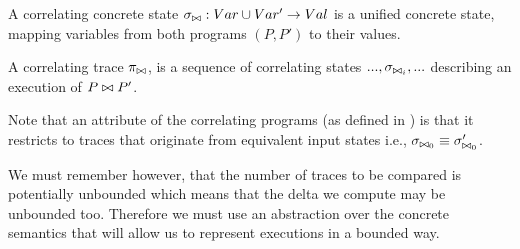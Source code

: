 \begin{definition}
A correlating concrete state $\sigma_{\bowtie} : Var \cup Var' \rightarrow Val$ is a unified concrete state, mapping variables from both programs $(P,P')$ to their values.
\end{definition}

\begin{definition}
A correlating trace $\pi_{\bowtie}$, is a sequence of correlating states $..., \sigma_{\bowtie_{i}}, ...$ describing an execution of $P \bowtie P'$.
\end{definition}

Note that an attribute of the correlating programs (as defined in ) is that it restricts to traces that originate from equivalent input states i.e., $\sigma_{\bowtie_{0}} \equiv \sigma'_{\bowtie_{0}}$.

We must remember however, that the number of traces to be compared is potentially unbounded which means that the delta we compute may be unbounded too. Therefore we must use an abstraction over the concrete semantics that will allow us to represent executions in a bounded way.
